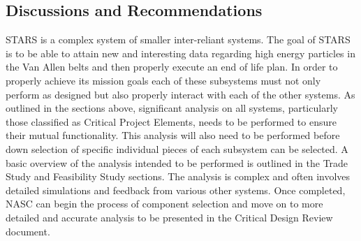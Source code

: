 \subsection{Discussions and Recommendations}

STARS is a complex system of smaller inter-reliant systems. The goal of STARS is to be able to attain new and interesting data regarding high energy particles in the Van Allen belts and then properly execute an end of life plan. In order to properly achieve its mission goals each of these subsystems must not only perform as designed but also properly interact with each of the other systems. As outlined in the sections above, significant analysis on all systems, particularly those classified as Critical Project Elements, needs to be performed to ensure their mutual functionality. This analysis will also need to be performed before down selection of specific individual pieces of each subsystem can be selected. A basic overview of the analysis intended to be performed is outlined in the Trade Study and Feasibility Study sections. The analysis is complex and often involves detailed simulations and feedback from various other systems. Once completed, NASC can begin the process of component selection and move on to more detailed and accurate analysis to be presented in the Critical Design Review document. 
